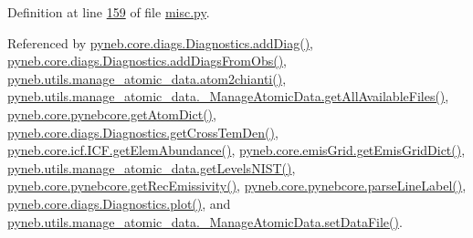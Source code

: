 Definition at line \hyperlink{misc_8py_source_l00159}{159} of file \hyperlink{misc_8py_source}{misc.\-py}.



Referenced by \hyperlink{diags_8py_source_l00246}{pyneb.\-core.\-diags.\-Diagnostics.\-add\-Diag()}, \hyperlink{diags_8py_source_l00353}{pyneb.\-core.\-diags.\-Diagnostics.\-add\-Diags\-From\-Obs()}, \hyperlink{manage__atomic__data_8py_source_l00009}{pyneb.\-utils.\-manage\-\_\-atomic\-\_\-data.\-atom2chianti()}, \hyperlink{manage__atomic__data_8py_source_l00190}{pyneb.\-utils.\-manage\-\_\-atomic\-\_\-data.\-\_\-\-Manage\-Atomic\-Data.\-get\-All\-Available\-Files()}, \hyperlink{pynebcore_8py_source_l03214}{pyneb.\-core.\-pynebcore.\-get\-Atom\-Dict()}, \hyperlink{diags_8py_source_l00554}{pyneb.\-core.\-diags.\-Diagnostics.\-get\-Cross\-Tem\-Den()}, \hyperlink{icf_8py_source_l00954}{pyneb.\-core.\-icf.\-I\-C\-F.\-get\-Elem\-Abundance()}, \hyperlink{emis_grid_8py_source_l00315}{pyneb.\-core.\-emis\-Grid.\-get\-Emis\-Grid\-Dict()}, \hyperlink{manage__atomic__data_8py_source_l00606}{pyneb.\-utils.\-manage\-\_\-atomic\-\_\-data.\-get\-Levels\-N\-I\-S\-T()}, \hyperlink{pynebcore_8py_source_l03158}{pyneb.\-core.\-pynebcore.\-get\-Rec\-Emissivity()}, \hyperlink{pynebcore_8py_source_l03289}{pyneb.\-core.\-pynebcore.\-parse\-Line\-Label()}, \hyperlink{diags_8py_source_l00421}{pyneb.\-core.\-diags.\-Diagnostics.\-plot()}, and \hyperlink{manage__atomic__data_8py_source_l00380}{pyneb.\-utils.\-manage\-\_\-atomic\-\_\-data.\-\_\-\-Manage\-Atomic\-Data.\-set\-Data\-File()}.



